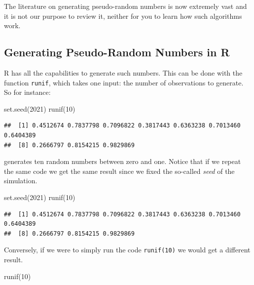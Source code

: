 \documentclass[
]{book}
\newenvironment{Shaded}{\begin{snugshade}}{\end{snugshade}}
\newcommand{\DecValTok}[1]{\textcolor[rgb]{0.00,0.00,0.81}{#1}}
\newcommand{\FunctionTok}[1]{\textcolor[rgb]{0.00,0.00,0.00}{#1}}
\newcommand{\NormalTok}[1]{#1}
\begin{document}
The literature on generating pseudo-random numbers is now extremely vast and it is not our purpose to review it, neither for you to learn how such algorithms work.

\hypertarget{generating-pseudo-random-numbers-in-r}{%
\subsection{Generating Pseudo-Random Numbers in R}\label{generating-pseudo-random-numbers-in-r}}

R has all the capabilities to generate such numbers. This can be done with the function \texttt{runif}, which takes one input: the number of observations to generate. So for instance:

\begin{Shaded}
\begin{Highlighting}[]
\FunctionTok{set.seed}\NormalTok{(}\DecValTok{2021}\NormalTok{)}
\FunctionTok{runif}\NormalTok{(}\DecValTok{10}\NormalTok{)}
\end{Highlighting}
\end{Shaded}

\begin{verbatim}
##  [1] 0.4512674 0.7837798 0.7096822 0.3817443 0.6363238 0.7013460 0.6404389
##  [8] 0.2666797 0.8154215 0.9829869
\end{verbatim}

generates ten random numbers between zero and one. Notice that if we repeat the same code we get the same result since we fixed the so-called \emph{seed} of the simulation.

\begin{Shaded}
\begin{Highlighting}[]
\FunctionTok{set.seed}\NormalTok{(}\DecValTok{2021}\NormalTok{)}
\FunctionTok{runif}\NormalTok{(}\DecValTok{10}\NormalTok{)}
\end{Highlighting}
\end{Shaded}

\begin{verbatim}
##  [1] 0.4512674 0.7837798 0.7096822 0.3817443 0.6363238 0.7013460 0.6404389
##  [8] 0.2666797 0.8154215 0.9829869
\end{verbatim}

Conversely, if we were to simply run the code \texttt{runif(10)} we would get a different result.

\begin{Shaded}
\begin{Highlighting}[]
\FunctionTok{runif}\NormalTok{(}\DecValTok{10}\NormalTok{)}
\end{Highlighting}
\end{Shaded}
\end{document}
